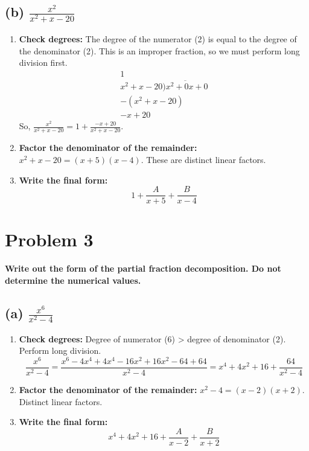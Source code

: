 \documentclass{article}
\begin{document}
\subsection*{(b) $\displaystyle\frac{x^2}{x^2+x-20}$}
\begin{enumerate}
    \item \textbf{Check degrees:} The degree of the numerator (2) is equal to the degree of the denominator (2). This is an improper fraction, so we must perform long division first.
    \[
    \begin{array}{r} 1 \\ x^2+x-20 \overline{) x^2+0x+0} \\ - (x^2+x-20) \\ \hline -x+20 \end{array}
    \]
    So, $\displaystyle\frac{x^2}{x^2+x-20} = 1 + \frac{-x+20}{x^2+x-20}$.
    \item \textbf{Factor the denominator of the remainder:} $x^2+x-20 = (x+5)(x-4)$. These are distinct linear factors.
    \item \textbf{Write the final form:}
    \[ 1 + \frac{A}{x+5} + \frac{B}{x-4} \]
\end{enumerate}

\section{Problem 3}
\textbf{Write out the form of the partial fraction decomposition. Do not determine the numerical values.}
\subsection*{(a) $\displaystyle\frac{x^6}{x^2-4}$}
\begin{enumerate}
    \item \textbf{Check degrees:} Degree of numerator (6) > degree of denominator (2). Perform long division.
    \[
    \frac{x^6}{x^2-4} = \frac{x^6-4x^4+4x^4-16x^2+16x^2-64+64}{x^2-4} = x^4+4x^2+16+\frac{64}{x^2-4}
    \]
    \item \textbf{Factor the denominator of the remainder:} $x^2-4 = (x-2)(x+2)$. Distinct linear factors.
    \item \textbf{Write the final form:}
    \[ x^4+4x^2+16 + \frac{A}{x-2} + \frac{B}{x+2} \]
\end{enumerate}
\end{document}
